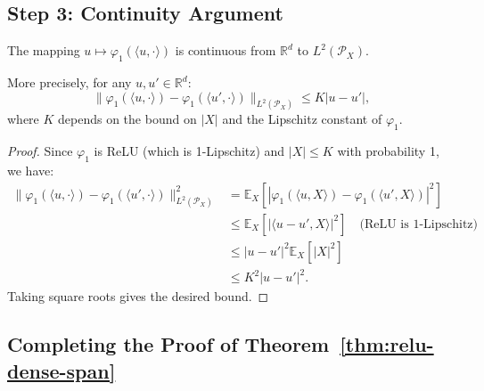 \subsection{Step 3: Continuity Argument}

\begin{lemma}
\label{lem:continuity-relu}
The mapping $u \mapsto \varphi_1(\langle u, \cdot\rangle)$ is continuous from $\mathbb{R}^d$ to $L^2(\mathcal{P}_X)$.

More precisely, for any $u, u' \in \mathbb{R}^d$:
\[
\|\varphi_1(\langle u, \cdot\rangle) - \varphi_1(\langle u', \cdot\rangle)\|_{L^2(\mathcal{P}_X)} \le K |u - u'|,
\]
where $K$ depends on the bound on $|X|$ and the Lipschitz constant of $\varphi_1$.
\end{lemma}

\begin{proof}
Since $\varphi_1$ is ReLU (which is 1-Lipschitz) and $|X| \le K$ with probability 1, we have:
\begin{align*}
\|\varphi_1(\langle u, \cdot\rangle) - \varphi_1(\langle u', \cdot\rangle)\|_{L^2(\mathcal{P}_X)}^2 
&= \mathbb{E}_X[|\varphi_1(\langle u, X\rangle) - \varphi_1(\langle u', X\rangle)|^2]\\
&\le \mathbb{E}_X[|\langle u - u', X\rangle|^2] \quad \text{(ReLU is 1-Lipschitz)}\\
&\le |u - u'|^2 \mathbb{E}_X[|X|^2]\\
&\le K^2 |u - u'|^2.
\end{align*}
Taking square roots gives the desired bound.
\end{proof}

\subsection{Completing the Proof of Theorem~\ref{thm:relu-dense-span}}

